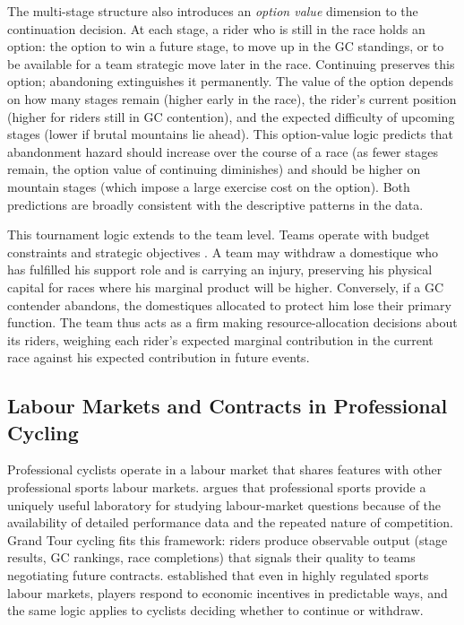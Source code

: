 The multi-stage structure also introduces an \emph{option value} dimension to the continuation decision. At each stage, a rider who is still in the race holds an option: the option to win a future stage, to move up in the GC standings, or to be available for a team strategic move later in the race. Continuing preserves this option; abandoning extinguishes it permanently. The value of the option depends on how many stages remain (higher early in the race), the rider's current position (higher for riders still in GC contention), and the expected difficulty of upcoming stages (lower if brutal mountains lie ahead). This option-value logic predicts that abandonment hazard should increase over the course of a race (as fewer stages remain, the option value of continuing diminishes) and should be higher on mountain stages (which impose a large exercise cost on the option). Both predictions are broadly consistent with the descriptive patterns in the data.

This tournament logic extends to the team level. Teams operate with budget constraints and strategic objectives \parencite{blair2012sports}. A team may withdraw a domestique who has fulfilled his support role and is carrying an injury, preserving his physical capital for races where his marginal product will be higher. Conversely, if a GC contender abandons, the domestiques allocated to protect him lose their primary function. The team thus acts as a firm making resource-allocation decisions about its riders, weighing each rider's expected marginal contribution in the current race against his expected contribution in future events.

\subsection{Labour Markets and Contracts in Professional Cycling}

Professional cyclists operate in a labour market that shares features with other professional sports labour markets. \textcite{kahn2000labormarket} argues that professional sports provide a uniquely useful laboratory for studying labour-market questions because of the availability of detailed performance data and the repeated nature of competition. Grand Tour cycling fits this framework: riders produce observable output (stage results, GC rankings, race completions) that signals their quality to teams negotiating future contracts. \textcite{rottenberg1956baseball} established that even in highly regulated sports labour markets, players respond to economic incentives in predictable ways, and the same logic applies to cyclists deciding whether to continue or withdraw.

